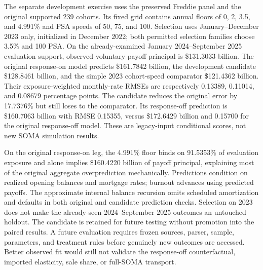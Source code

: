 The separate development exercise uses the preserved Freddie panel and the original supported 239 cohorts. Its fixed grid contains annual floors of 0, 2, 3.5, and 4.991\% and PSA speeds of 50, 75, and 100. Selection uses January--December 2023 only, initialized in December 2022; both permitted selection families choose 3.5\% and 100 PSA. On the already-examined January 2024--September 2025 evaluation support, observed voluntary payoff principal is \$131.3033 billion. The original response-on model predicts \$161.7842 billion, the development candidate \$128.8461 billion, and the simple 2023 cohort-speed comparator \$121.4362 billion. Their exposure-weighted monthly-rate RMSEs are respectively 0.13389, 0.11014, and 0.08679 percentage points. The candidate reduces the original error by 17.7376\% but still loses to the comparator. Its response-off prediction is \$160.7063 billion with RMSE 0.15355, versus \$172.6429 billion and 0.15700 for the original response-off model. These are legacy-input conditional scores, not new SOMA simulation results.

On the original response-on leg, the 4.991\% floor binds on 91.5353\% of evaluation exposure and alone implies \$160.4220 billion of payoff principal, explaining most of the original aggregate overprediction mechanically. Predictions condition on realized opening balances and mortgage rates; burnout advances using predicted payoffs. The approximate internal balance recursion omits scheduled amortization and defaults in both original and candidate prediction checks. Selection on 2023 does not make the already-seen 2024--September 2025 outcomes an untouched holdout. The candidate is retained for future testing without promotion into the paired results. A future evaluation requires frozen sources, parser, sample, parameters, and treatment rules before genuinely new outcomes are accessed. Better observed fit would still not validate the response-off counterfactual, imported elasticity, sale share, or full-SOMA transport.
